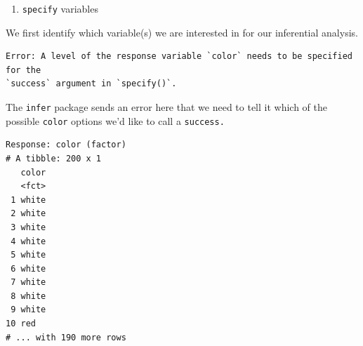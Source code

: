 \documentclass[12pt, krantz2,]{krantz}
\makeatletter
\newenvironment{Shaded}{\begin{snugshade}}{\end{snugshade}}
\newcommand{\DataTypeTok}[1]{\textcolor[rgb]{0.27,0.27,0.27}{#1}}
\newcommand{\DecValTok}[1]{\textcolor[rgb]{0.06,0.06,0.06}{#1}}
\newcommand{\KeywordTok}[1]{\textcolor[rgb]{0.27,0.27,0.27}{\textbf{#1}}}
\newcommand{\NormalTok}[1]{#1}
\newcommand{\OperatorTok}[1]{\textcolor[rgb]{0.43,0.43,0.43}{\textbf{#1}}}
\newcommand{\OtherTok}[1]{\textcolor[rgb]{0.37,0.37,0.37}{#1}}
\newcommand{\StringTok}[1]{\textcolor[rgb]{0.5,0.5,0.5}{#1}}
\providecommand{\tightlist}{%
  \setlength{\itemsep}{0pt}\setlength{\parskip}{0pt}}
\newenvironment{kframe}{%
\medskip{}
\setlength{\fboxsep}{.8em}
 \def\at@end@of@kframe{}%
 \ifinner\ifhmode%
  \def\at@end@of@kframe{\end{minipage}}%
  \begin{minipage}{\columnwidth}%
 \fi\fi%
 \def\FrameCommand##1{\hskip\@totalleftmargin \hskip-\fboxsep
 \colorbox{shadecolor}{##1}\hskip-\fboxsep
     \hskip-\linewidth \hskip-\@totalleftmargin \hskip\columnwidth}%
 \MakeFramed {\advance\hsize-\width
   \@totalleftmargin\z@ \linewidth\hsize
   \@setminipage}}%
 {\par\unskip\endMakeFramed%
 \at@end@of@kframe}
\renewenvironment{Shaded}{\begin{kframe}}{\end{kframe}}
\makeatother
\begin{document}
\begin{Shaded}
\end{Shaded}

\begin{enumerate}
\def\labelenumi{\arabic{enumi}.}
\tightlist
\item
  \texttt{specify} variables
\end{enumerate}

We first identify which variable(s) we are interested in for our inferential analysis.

\begin{Shaded}
\end{Shaded}

\begin{verbatim}
Error: A level of the response variable `color` needs to be specified for the
`success` argument in `specify()`.
\end{verbatim}

The \texttt{infer} package sends an error here that we need to tell it which of the possible \texttt{color} options we'd like to call a \texttt{success.}

\begin{Shaded}
\end{Shaded}

\begin{verbatim}
Response: color (factor)
# A tibble: 200 x 1
   color
   <fct>
 1 white
 2 white
 3 white
 4 white
 5 white
 6 white
 7 white
 8 white
 9 white
10 red  
# ... with 190 more rows
\end{verbatim}
\end{document}
